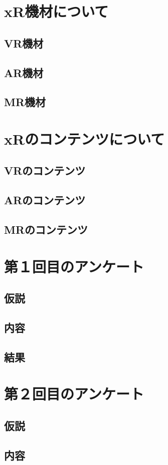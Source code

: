 \documentclass[12pt,a4j]{ltjsarticle}
\begin{document}
\section{xR機材について}
\subsection{VR機材}
\subsection{AR機材}
\subsection{MR機材}
\section{xRのコンテンツについて}
\subsection{VRのコンテンツ}
\subsection{ARのコンテンツ}
\subsection{MRのコンテンツ}
\section{第１回目のアンケート}
\subsection{仮説}
\subsection{内容}
\subsection{結果}
\section{第２回目のアンケート}
\subsection{仮説}
\subsection{内容}
\end{document}
